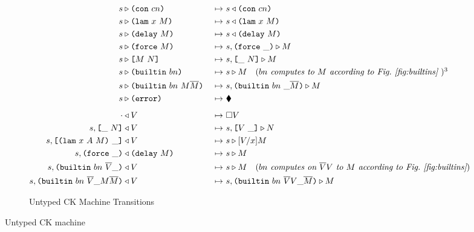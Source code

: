 \documentclass[../plutus-core-specification.tex]{subfiles}
\begin{document}
\begin{figure}[H]
\begin{subfigure}[c]{\linewidth}
\hspace{-1cm}\begin{minipage}{\linewidth}
\begin{alignat*}{2}
        \cksteps{\ckforward{s&}{\con{cn}}&} {&\ckbackward{s}{\con{cn}}}\\
        \cksteps{\ckforward{s&}{\lamU{x}{M}}&} {&\ckbackward{s}{\lamU{x}{M}}}\\
        \cksteps{\ckforward{s&}{\delay{M}}&} {&\ckbackward{s}{\delay{M}}}\\
        \cksteps{\ckforward{s&}{\force{M}}&} {&\ckforward{s, \inForceFrame{}}{M}}\\
        \cksteps{\ckforward{s&}{\appU{M}{N}}&} {&\ckforward{s, \inAppLeftFrame{N}}{M}}\\
        \cksteps{\ckforward{s&}{\builtinU{bn}{\!\!}}&} {&\ckforward{s}{M}}
        \quad (\textit{$bn$ computes to $M$ according to Fig.~\ref{fig:builtins} })\footnotemark[3]\\
       \cksteps{\ckforward{s&}{\builtinU{bn}{M \repetition{M}}}&} {&\ckforward{s, \inBuiltinU{bn}{}{\_}{\repetition{M}}}{M}}\\
       \cksteps{\ckforward{s&}{\errorU}&} {&\ckerror{}}\\
       \\[-10pt] %
        \cksteps{\ckbackward{\cdot&}{V}&} {&\square V}\\
        \cksteps{\ckbackward{s, \inAppLeftFrame{N}&}{V}&} {&\ckforward{s, \inAppRightFrame{V}}{N}}\\
        \cksteps{\ckbackward{s, \inAppRightFrame{\lam{x}{A}{M}}&}{V}&} {&\ckforward{s}{\subst{V}{x}{M}}}\\
        \cksteps{\ckbackward{s, \inForceFrame{}&}{\delay{M}}&} {&\ckforward{s}{M}}\\
        \cksteps{\ckbackward{s, \inBuiltinU{bn}{\repetition{V}}{\_}{}&}{V}&} {&\ckforward{s}{M}}
          \quad (\textit{$bn$ computes on $\repetition{V}V$ to $M$ according to Fig.~\ref{fig:builtins}})\\
          \cksteps{\ckbackward{s, \inBuiltinU{bn}{\repetition{V}}{\_}{M \repetition{M}}&}{V}&}
                  {&\ckforward{s, \inBuiltinU{bn}{\repetition{V} V}{\_}{\repetition{M}}}{M}}\\
    \end{alignat*}
\end{minipage}
    \caption{Untyped CK Machine Transitions}
    \label{fig:untyped-ck-transitions}
\end{subfigure}
\caption{Untyped CK machine}
\label{fig:untyped-ck-machine}
\end{figure}

\end{document}
